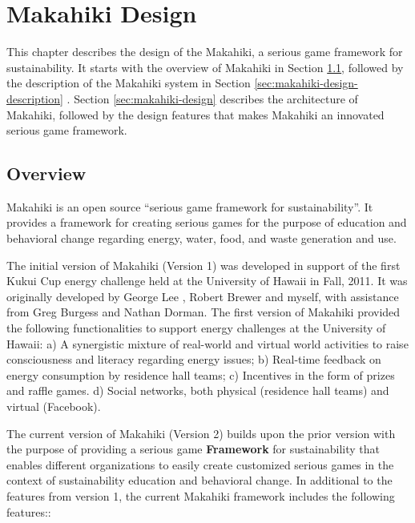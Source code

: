 \chapter{Makahiki Design}
\label{cha:makahiki-design}

This chapter describes the design of the Makahiki, a serious game framework for sustainability. It starts with the overview of Makahiki in Section \ref{sec:makahiki-design-overview}, followed by the description of the Makahiki system in Section \ref{sec:makahiki-design-description}
. Section \ref{sec:makahiki-design}
 describes the architecture of Makahiki, followed by the design features that makes Makahiki an innovated serious game framework.

\section{Overview}
\label{sec:makahiki-design-overview}

Makahiki is an open source ``serious game framework for sustainability''. It provides a framework for creating serious games for the purpose of education and behavioral change regarding energy, water, food, and waste generation and use.

The initial version of Makahiki (Version 1) was developed in support of the first Kukui Cup energy challenge \cite{csdl2-10-08} held at the University of Hawaii in Fall, 2011. It was originally developed by George Lee \cite{csdl2-11-01}, Robert Brewer \cite{csdl2-10-08} and myself, with assistance from Greg Burgess and Nathan Dorman. The first version of Makahiki provided the following functionalities to support energy challenges at the University of Hawaii: a) A synergistic mixture of real-world and virtual world activities to raise  consciousness and literacy regarding energy issues; b) Real-time feedback on energy consumption by residence hall teams; c) Incentives in the form of prizes and raffle games. d) Social networks, both physical (residence hall teams) and virtual (Facebook).

The current version of Makahiki (Version 2) builds upon the prior version with the purpose of providing a serious game {\bf Framework} for sustainability that enables different organizations to easily create customized serious games in the context of sustainability education and behavioral change. In additional to the features from version 1, the current Makahiki framework includes the following features::

